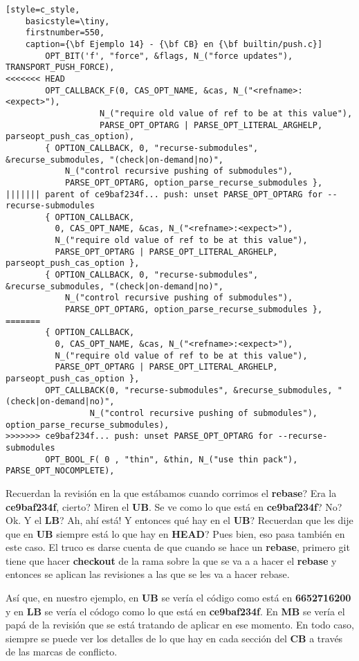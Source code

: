 \begin{lstlisting}[style=c_style,
	basicstyle=\tiny,
	firstnumber=550,
	caption={\bf Ejemplo 14} - {\bf CB} en {\bf builtin/push.c}]
		OPT_BIT('f', "force", &flags, N_("force updates"), TRANSPORT_PUSH_FORCE),
<<<<<<< HEAD
		OPT_CALLBACK_F(0, CAS_OPT_NAME, &cas, N_("<refname>:<expect>"),
			       N_("require old value of ref to be at this value"),
			       PARSE_OPT_OPTARG | PARSE_OPT_LITERAL_ARGHELP, parseopt_push_cas_option),
		{ OPTION_CALLBACK, 0, "recurse-submodules", &recurse_submodules, "(check|on-demand|no)",
			N_("control recursive pushing of submodules"),
			PARSE_OPT_OPTARG, option_parse_recurse_submodules },
||||||| parent of ce9baf234f... push: unset PARSE_OPT_OPTARG for --recurse-submodules
		{ OPTION_CALLBACK,
		  0, CAS_OPT_NAME, &cas, N_("<refname>:<expect>"),
		  N_("require old value of ref to be at this value"),
		  PARSE_OPT_OPTARG | PARSE_OPT_LITERAL_ARGHELP, parseopt_push_cas_option },
		{ OPTION_CALLBACK, 0, "recurse-submodules", &recurse_submodules, "(check|on-demand|no)",
			N_("control recursive pushing of submodules"),
			PARSE_OPT_OPTARG, option_parse_recurse_submodules },
=======
		{ OPTION_CALLBACK,
		  0, CAS_OPT_NAME, &cas, N_("<refname>:<expect>"),
		  N_("require old value of ref to be at this value"),
		  PARSE_OPT_OPTARG | PARSE_OPT_LITERAL_ARGHELP, parseopt_push_cas_option },
		OPT_CALLBACK(0, "recurse-submodules", &recurse_submodules, "(check|on-demand|no)",
			     N_("control recursive pushing of submodules"), option_parse_recurse_submodules),
>>>>>>> ce9baf234f... push: unset PARSE_OPT_OPTARG for --recurse-submodules
		OPT_BOOL_F( 0 , "thin", &thin, N_("use thin pack"), PARSE_OPT_NOCOMPLETE),
\end{lstlisting}

Recuerdan la revisión en la que estábamos cuando corrimos el {\bf rebase}? Era la {\bf ce9baf234f}, cierto? Miren el {\bf UB}.
Se ve como lo que está en {\bf ce9baf234f}? No? Ok. Y el {\bf LB}? Ah, ahí está! Y entonces qué hay en el {\bf UB}?
Recuerdan que les dije que en {\bf UB} siempre está lo que hay en {\bf HEAD}? Pues bien, eso pasa también en este caso.
El truco es darse cuenta de que cuando se hace un {\bf rebase}, primero git tiene que hacer {\bf checkout} de la rama sobre
la que se va a a hacer el {\bf rebase} y entonces se aplican las revisiones a las que se les va a hacer rebase.

Así que, en nuestro ejemplo, en {\bf UB} se vería el código como está en {\bf 6652716200} y en {\bf LB} se vería
el códogo como lo que está en {\bf ce9baf234f}. En {\bf MB} se vería el papá de la revisión que se está tratando de aplicar
en ese momento. En todo caso, siempre se puede ver los detalles de lo que hay en cada sección del {\bf CB} a través de las marcas
de conflicto.

